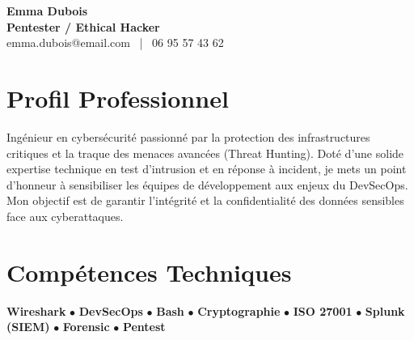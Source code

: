 \documentclass[11pt,a4paper]{article}
\begin{document}
\begin{center}
    {\Huge \textbf{Emma Dubois}} \\[0.2cm]
    {\Large \textbf{Pentester / Ethical Hacker}} \\[0.1cm]
    emma.dubois@email.com \ | \ 06 95 57 43 62
\end{center}

\vspace{0.3cm}

\section*{Profil Professionnel}
\noindent
Ingénieur en cybersécurité passionné par la protection des infrastructures critiques et la traque des menaces avancées (Threat Hunting). Doté d'une solide expertise technique en test d'intrusion et en réponse à incident, je mets un point d'honneur à sensibiliser les équipes de développement aux enjeux du DevSecOps. Mon objectif est de garantir l'intégrité et la confidentialité des données sensibles face aux cyberattaques.

\vspace{0.3cm}

\section*{Compétences Techniques}
\noindent
\textbf{Wireshark} $\bullet$ \textbf{DevSecOps} $\bullet$ \textbf{Bash} $\bullet$ \textbf{Cryptographie} $\bullet$ \textbf{ISO 27001} $\bullet$ \textbf{Splunk (SIEM)} $\bullet$ \textbf{Forensic} $\bullet$ \textbf{Pentest}

\vspace{0.3cm}

\end{document}
